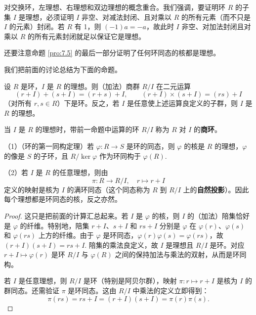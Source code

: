 对交换环，左理想、右理想和双边理想的概念重合。我们强调，要证明环 \(R\) 的子集 \(I\) 是理想，必须证明 \(I\) 非空、对减法封闭、且对乘以 \(R\) 的所有元素（而不只是 \(I\) 的元素）封闭。若 \(R\) 有 1，则 \((-1)a = -a\)，故此时 \(I\) 非空、对加法封闭且对乘以 \(R\) 的所有元素封闭就足以保证它是理想。

还要注意命题 \ref{pro:7.5} 的最后一部分证明了任何环同态的核都是理想。

我们把前面的讨论总结为下面的命题。

\begin{proposition}\label{pro:7.6}
设 \(R\) 是环，\(I\) 是 \(R\) 的理想。则（加法）商群 \(R/I\) 在二元运算
\[
(r+I) + (s+I) = (r+s)+I, \qquad (r+I) \times (s+I) = (rs)+I
\]
（对所有 \(r, s \in R\)）下是环。反之，若 \(I\) 是任意使上述运算良定义的子群，则 \(I\) 是 \(R\) 的理想。
\end{proposition}

\begin{definition}
当 \(I\) 是 \(R\) 的理想时，带前一命题中运算的环 \(R/I\) 称为 \(R\) 对 \(I\) 的\textbf{商环}。
\end{definition}

\begin{theorem}\label{thm:7.7}
（1）（环的第一同构定理）若 \(\varphi : R \to S\) 是环的同态，则 \(\varphi\) 的核是 \(R\) 的理想，\(\varphi\) 的像是 \(S\) 的子环，且 \(R/\ker\varphi\) 作为环同构于 \(\varphi(R)\).

（2）若 \(I\) 是 \(R\) 的任意理想，则由
\[
\pi : R \to R/I, \quad r \mapsto r+I
\]
定义的映射是核为 \(I\) 的满环同态（这个同态称为 \(R\) 到 \(R/I\) 上的\textbf{自然投影}）。因此每个理想都是环同态的核，反之亦然。
\end{theorem}

\begin{proof}
这只是把前面的计算汇总起来。若 \(I\) 是 \(\varphi\) 的核，则 \(I\) 的（加法）陪集恰好是 \(\varphi\) 的纤维。特别地，陪集 \(r+I\)、\(s+I\) 和 \(rs+I\) 分别是 \(\varphi\) 在 \(\varphi(r)\)、\(\varphi(s)\) 和 \(\varphi(rs)\) 上方的纤维。由于 \(\varphi\) 是环同态，\(\varphi(r)\varphi(s) = \varphi(rs)\)，故 \((r+I)(s+I) = rs+I\). 陪集的乘法良定义，故 \(I\) 是理想且 \(R/I\) 是环。对应 \(r+I \mapsto \varphi(r)\) 是环 \(R/I\) 与 \(\varphi(R)\) 之间的保持加法与乘法的双射，从而是环同构。

若 \(I\) 是任意理想，则 \(R/I\) 是环（特别是阿贝尔群），映射 \(\pi : r \mapsto r+I\) 是核为 \(I\) 的群同态。还需验证 \(\pi\) 是环同态。这由 \(R/I\) 中乘法的定义立即得到：
\[
\pi(rs) = rs+I = (r+I)(s+I) = \pi(r)\pi(s).
\]
\end{proof}


